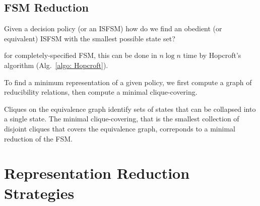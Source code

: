 \subsection{FSM Reduction}
Given a decision policy (or an ISFSM) how do we find an obedient (or
equivalent) ISFSM with the smallest possible state set?

for completely-specified FSM, this can be done in $n\log n$ time
by Hopcroft's algorithm (Alg.\ \ref{algo: Hopcroft}).


To find a minimum representation of a given policy,
we first compute a graph of reducibility relations, 
then compute a minimal clique-covering.

Cliques on the equivalence graph identify sets of states that can be
collapsed into a single state. The minimal clique-covering, that is the
smallest collection of disjoint cliques that covers the equivalence
graph, correponds to a minimal reduction of the FSM.

\section{Representation Reduction Strategies}


